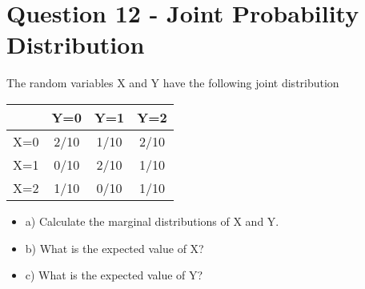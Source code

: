 \section{Question 12 - Joint Probability Distribution}
The random variables X and Y have the following joint distribution

\begin{center}
	\begin{tabular}{|c|c|c|c|}
		& Y=0  & Y=1  & Y=2  \\ \hline 
		X=0 & 2/10 & 1/10 & 2/10 \\ \hline 
		X=1 & 0/10 & 2/10 & 1/10 \\ \hline 
		X=2 & 1/10 & 0/10 & 1/10 \\ \hline 
		
	\end{tabular} 
\end{center}


\begin{itemize}
	\item a) Calculate the marginal distributions of X and Y.     
	\item b) What is the expected value of X?
	\item c) What is the expected value of Y? 
\end{itemize} 

